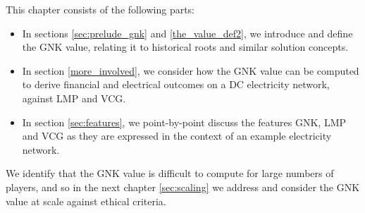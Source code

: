 This chapter consists of the following parts:

\begin{itemize}
\item	In sections \ref{sec:prelude_gnk} and \ref{the_value_def2}, we introduce and define the GNK value, relating it to historical roots and similar solution concepts.
\item	In section \ref{more_involved}, we consider how the GNK value can be computed to derive financial and electrical outcomes on a DC electricity network, against LMP and VCG.
\item	In section \ref{sec:features}, we point-by-point discuss the features GNK, LMP and VCG as they are expressed in the context of an example electricity network.
\end{itemize}

We identify that the GNK value is difficult to compute for large numbers of players, and so in the next chapter \ref{sec:scaling} we address and consider the GNK value at scale against ethical criteria.




